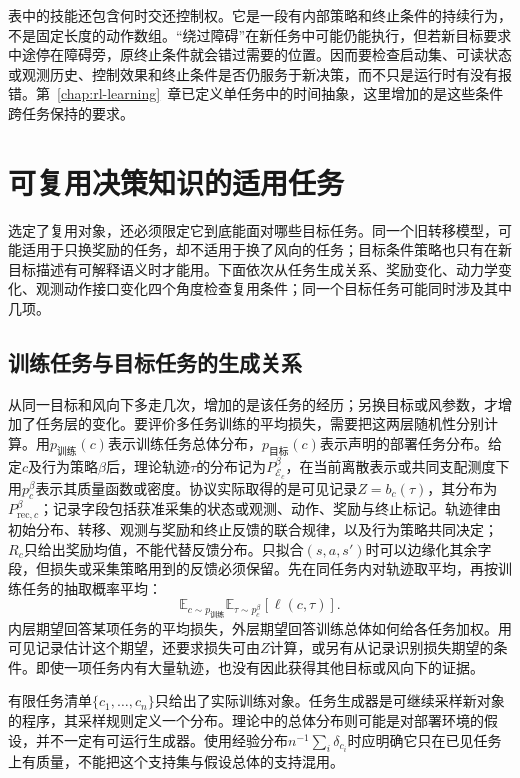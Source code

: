 表中的技能还包含何时交还控制权。它是一段有内部策略和终止条件的持续行为，不是固定长度的动作数组。“绕过障碍”在新任务中可能仍能执行，但若新目标要求中途停在障碍旁，原终止条件就会错过需要的位置。因而要检查启动集、可读状态或观测历史、控制效果和终止条件是否仍服务于新决策，而不只是运行时有没有报错。第~\ref{chap:rl-learning}~章已定义单任务中的时间抽象，这里增加的是这些条件跨任务保持的要求。

\section{可复用决策知识的适用任务}
\label{sec:rl-transfer-applicability}

选定了复用对象，还必须限定它到底能面对哪些目标任务。同一个旧转移模型，可能适用于只换奖励的任务，却不适用于换了风向的任务；目标条件策略也只有在新目标描述有可解释语义时才能用。下面依次从任务生成关系、奖励变化、动力学变化、观测动作接口变化四个角度检查复用条件；同一个目标任务可能同时涉及其中几项。

\subsection{训练任务与目标任务的生成关系}
\label{sec:rl-transfer-distributions}

从同一目标和风向下多走几次，增加的是该任务的经历；另换目标或风参数，才增加了任务层的变化。要评价多任务训练的平均损失，需要把这两层随机性分别计算。用$p_{\text{训练}}(c)$表示训练任务总体分布，$p_{\text{目标}}(c)$表示声明的部署任务分布。给定$c$及行为策略$\beta$后，理论轨迹$\tau$的分布记为$P_{\mathcal E_c}^\beta$，在当前离散表示或共同支配测度下用$p_c^\beta$表示其质量函数或密度。协议实际取得的是可见记录$Z=b_c(\tau)$，其分布为$P_{\mathrm{rec},c}^\beta$；记录字段包括获准采集的状态或观测、动作、奖励与终止标记。轨迹律由初始分布、转移、观测与奖励和终止反馈的联合规律，以及行为策略共同决定；$R_c$只给出奖励均值，不能代替反馈分布。只拟合$(s,a,s')$时可以边缘化其余字段，但损失或采集策略用到的反馈必须保留。先在同任务内对轨迹取平均，再按训练任务的抽取概率平均：
\[
  \mathbb E_{c\sim p_{\text{训练}}}
  \mathbb E_{\tau\sim p_c^\beta}[\ell(c,\tau)].
\]
内层期望回答某项任务的平均损失，外层期望回答训练总体如何给各任务加权。用可见记录估计这个期望，还要求损失可由$Z$计算，或另有从记录识别损失期望的条件。即使一项任务内有大量轨迹，也没有因此获得其他目标或风向下的证据。

有限任务清单$\{c_1,\ldots,c_n\}$只给出了实际训练对象。任务生成器是可继续采样新对象的程序，其采样规则定义一个分布。理论中的总体分布则可能是对部署环境的假设，并不一定有可运行生成器。使用经验分布$n^{-1}\sum_i\delta_{c_i}$时应明确它只在已见任务上有质量，不能把这个支持集与假设总体的支持混用。

